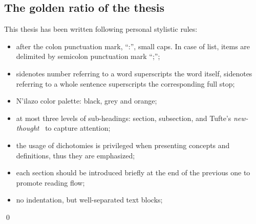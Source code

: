 \subsection{The golden ratio of the thesis}
This thesis has been written following personal stylistic rules:
\begin{itemize}
    \item after the colon punctuation mark, ``:'', small caps. In case of list, items are delimited by semicolon punctuation mark ``;'';
    \item sidenotes number referring to a word superscripts the word itself, sidenotes referring to a whole sentence superscripts the corresponding full stop;
    \item N'ilazo color palette: black, grey and orange;
    \item at most three levels of sub-headings: section, subsection, and Tufte's \textit{new-thought}~ to capture attention;
    \item the usage of dichotomies is privileged when presenting concepts and definitions, thus they are emphasized;
    \item each section should be introduced briefly at the end of the previous one to promote reading flow;
    \item no indentation, but well-separated text blocks;
\end{itemize}
\qed








